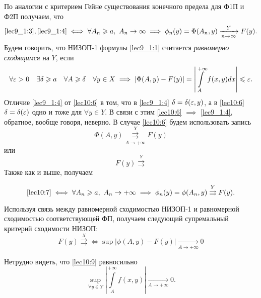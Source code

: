 \documentclass[../../main.tex]{subfiles}
\begin{document}
По аналогии с критерием Гейне существования конечного предела для Ф1П и Ф2П 
получаем, что 
\[\eqref{lec9_1:3}, \eqref{lec9_1:4} \iff \forall A_n \ge 
a,\ A_n \to \infty \implies \phi_n(y) =\Phi(A_n,y) \xrightarrow[n\rightarrow 
\infty]{Y}F(y).\]
Будем говорить, что НИЗОП-1 формулы \eqref{lec9_1:1}  считается 
\emph{равномерно сходящимся} на $Y$, если
\begin{equation}
\label{lec10:6}
\forall \eps > 0\quad \exists \delta \ge a\quad \forall A \ge \delta\quad 
\forall y\in X 
\implies \left| \Phi(A,y) - F(y) \right| = \left| \int\limits_A^{+\infty} 
f(x,y) dx \right| \le \eps.
\end{equation}
Отличие \eqref{lec9_1:4} от \eqref{lec10:6} в том, что в \eqref{lec9_1:4} 
$\delta = 
\delta(\eps,y)$, а в \eqref{lec10:6} $\delta = \delta(\eps)$ одно и тоже для
$\forall y \in Y$. В связи с этим \eqref{lec10:6} $\implies$ \eqref{lec9_1:4}, 
обратное, вообще говоря, неверно. 
В случае \eqref{lec10:6} будем использовать запись \begin{equation}
\label{lec10:7}
\Phi(A,y)\overset{Y}{\underset{A \to +\infty}{\rightrightarrows}}F(y)
\end{equation}
или 
\begin{equation}
F(y)\overset{Y}{\rightrightarrows}
\end{equation}
Также как и выше, получаем 

\begin{thm}
\begin{equation}
\label{lec10:8}
 \eqref{lec10:7} \iff \forall A_n \ge a,\ A_n\rightarrow +\infty \implies 
 \phi_n(y) = \phi(A_n,y) \overset{Y}\rightrightarrows F(y).
\end{equation}
\end{thm}
Используя связь между равномерной сходимостью НИЗОП-1 и равномерной 
сходимостью соответствующей ФП, получаем следующий супремальный критерий 
сходимости НИЗОП:
\begin{equation}
\label{lec10:9}
F(y)\overset{X} \rightrightarrows \iff \sup\left|\phi(A , y) - F(y) \right| 
\underset{A \to + \infty}\to 0 \end{equation}

Нетрудно видеть, что \eqref{lec10:9} равносильно
\begin{equation}
\label{lec10:10} \underset{\forall y \in 
Y}\sup\left|\int\limits_A^{+\infty} f(x,y)\right| \underset{A \to + \infty} 
\to 0. \end{equation}
\end{document}
